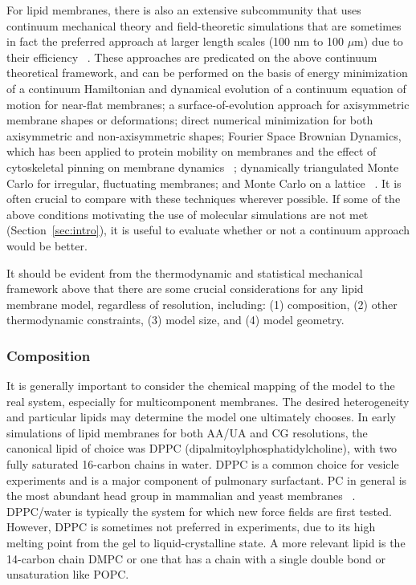 \documentclass[9pt,bestpractices,pubversion]{livecoms}
\begin{document}
For lipid membranes, there is also an extensive subcommunity that uses continuum mechanical theory and field-theoretic simulations that are sometimes in fact the preferred approach at larger length scales (100 nm to 100 $\mu$m) due to their efficiency ~\cite{Smirnova2015,Brown2008,Sapp2014}.
These approaches are predicated on the above continuum theoretical framework, and can be performed on the basis of energy minimization of a continuum Hamiltonian and dynamical evolution of a continuum equation of motion for near-flat membranes; a surface-of-evolution approach for axisymmetric membrane shapes or deformations; direct numerical minimization for both axisymmetric and non-axisymmetric shapes; Fourier Space Brownian Dynamics, which has been applied to protein mobility on membranes and the effect of cytoskeletal pinning on membrane dynamics ~\cite{Brown2008,Brannigan2006,Lin2005,Lin2004}; dynamically triangulated Monte Carlo for irregular, fluctuating membranes; and Monte Carlo on a lattice  ~\cite{Brannigan2006d,Ramakrishnan2014c}.
It is often crucial to compare with these techniques wherever possible.
If some of the above conditions motivating the use of molecular simulations are not met (Section~\ref{sec:intro}), it is useful to evaluate whether or not a continuum approach would be better.

It should be evident from the thermodynamic and statistical mechanical framework above that there are some crucial considerations for any lipid membrane model, regardless of resolution, including: (1) composition, (2) other thermodynamic constraints, (3) model size, and (4) model geometry.

\subsubsection{Composition}
\label{subsubsec:composition}

It is generally important to consider the chemical mapping of the model to the real system, especially for multicomponent membranes.
The desired heterogeneity and particular lipids may determine the model one ultimately chooses.
In early simulations of lipid membranes for both AA/UA and CG resolutions, the canonical lipid of choice was DPPC (dipalmitoylphosphatidylcholine), with two fully saturated 16-carbon chains in water.
DPPC is a common choice for vesicle experiments and is a major component of pulmonary surfactant.
PC in general is the most abundant head group in mammalian and yeast membranes ~\cite{VanMeer2008,Sampaio2011}.
DPPC/water is typically the system for which new force fields are first tested.
However, DPPC is sometimes not preferred in experiments, due to its high melting point from the gel to liquid-crystalline state.
A more relevant lipid is the 14-carbon chain DMPC or one that has a chain with a single double bond or unsaturation like POPC.
\end{document}
